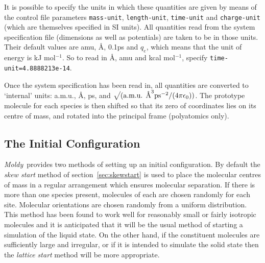 \documentclass[twoside]{report}
\newcommand{\moldy}{{\em Moldy}}
\newcommand{\insqrt}{\sqrt{\mathstrut}}
\begin{document}
It is possible to specify the units in which these quantities are given
by means of the control file parameters \texttt{mass-unit},
\texttt{length-unit}, \texttt{time-unit} and \texttt{charge-unit} 
(which are themselves specified in SI units). All quantities read from
the system specification file (dimensions as well as potentials) are
taken to be in those units. Their default values are amu, \AA, 0.1ps
and $q_{e}$, which means that the unit of energy is kJ mol$^{-1}$.  So
to read in \AA, amu and kcal mol$^{-1}$, specify
\texttt{time-unit=4.8888213e-14}.

Once the system specification has been read in, all quantities are
converted to `internal' units: a.m.u., \AA, ps, and $\insqrt (
\mbox{a.m.u. \AA}^{3} \mbox{ps}^{-2}/(4 \pi \epsilon_{0}) )$.
The prototype molecule for each species is then shifted so that its
zero of coordinates lies on its centre of mass, and rotated into the
principal frame (polyatomics only).

\subsection{The Initial Configuration}

\moldy\  provides two methods of setting up an initial configuration.
By default the {\em skew start\/} method of section~\ref{sec:skewstart}
is used to place the molecular centres of mass in a regular
arrangement which ensures molecular separation.  If there is more than
one species present, molecules of each are chosen randomly for each
site.  Molecular orientations are chosen randomly from a uniform
distribution.  This method has been found to work well for reasonably
small or fairly isotropic molecules and it is anticipated that it will
be the usual method of starting a simulation of the liquid state.   On
the other hand, if the constituent molecules are sufficiently large
and irregular, or if it is intended to simulate the solid state then
the {\em lattice start\/} method will be more appropriate.
\end{document}
